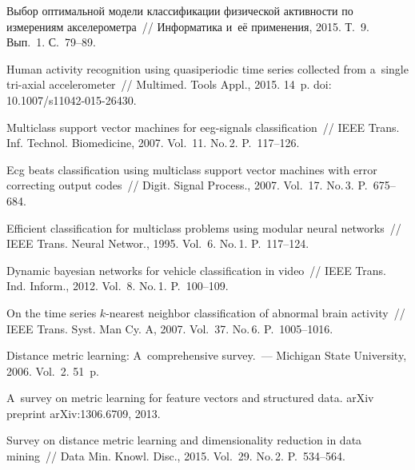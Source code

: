 \begin{multicols}{2}
{\small\frenchspacing
 {%
 \begin{thebibliography}{99}

Выбор оптимальной модели классификации физической активности по
измерениям акселерометра~// Информатика и~её применения,
2015. Т.~9. Вып.~1. С.~79--89.

Human activity recognition using quasiperiodic time series collected
  from a~single tri-axial accelerometer~// Multimed. Tools  Appl., 2015. 14~p.
  doi: 10.1007/s11042-015-26430.

Multiclass support vector machines for eeg-signals classification~//
IEEE Trans. Inf. Technol. Biomedicine, 2007. Vol.~11. No.\,2. P.~117--126.

Ecg beats classification using multiclass support vector machines
  with error correcting output codes~// Digit. Signal Process., 2007. Vol.~17. No.\,3. P.~675--684.

Efficient classification for multiclass problems using modular neural
  networks~// IEEE Trans. Neural Networ., 1995. Vol.~6. No.\,1. P.~117--124.

Dynamic bayesian networks for vehicle classification in video~// IEEE Trans. 
Ind. Inform., 2012. Vol.~8. No.\,1. P.~100--109.

On the time series $k$-nearest neighbor classification of abnormal
  brain activity~// IEEE Trans. Syst. Man  Cy. A,
2007. Vol.~37. No.\,6. P.~1005--1016.

Distance metric learning: A~comprehensive survey.~--- 
Michigan State University, 2006. Vol.~2. 51~p.

A~survey on metric learning for feature vectors and structured data.
arXiv preprint arXiv:1306.6709, 2013.



Survey on distance metric learning and dimensionality reduction in data mining~//
Data Min. Knowl. Disc., 2015. Vol.~29. No.\,2. P.~534--564.


\end{thebibliography}}}
\end{multicols}
